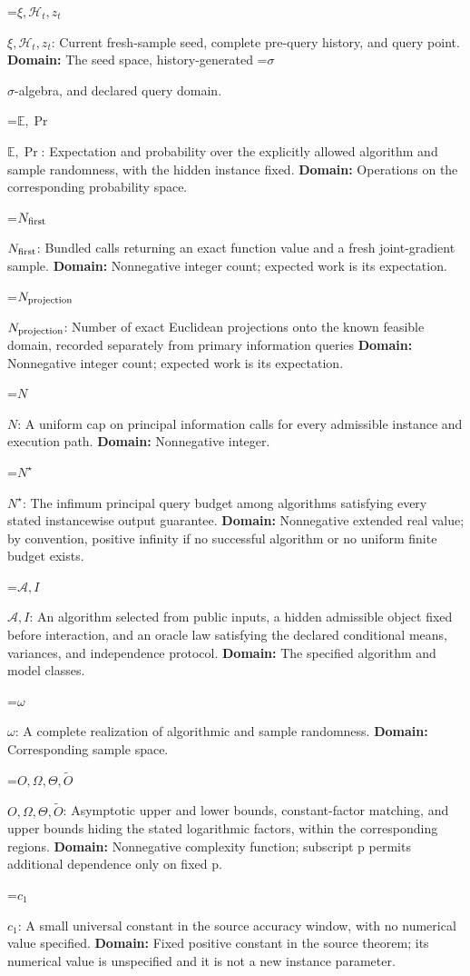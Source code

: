 \documentclass[10pt,a4paper]{article}
\newcommand{\AtlasMath}[1]{\par\begingroup\centering\setbox0=\hbox{$\displaystyle #1$}\ifdim\wd0>1.4\linewidth\typeout{ATLAS WIDE FORMULA: \the\wd0}\fi\ifdim\wd0>\linewidth\resizebox{\linewidth}{!}{\box0}\else\box0\fi\par\endgroup}
\newcommand{\AtlasInlineMath}[1]{\begingroup\setbox0=\hbox{$#1$}\ifdim\wd0>.4\linewidth\endgroup\AtlasMath{#1}\else\endgroup$#1$\fi}
\begin{document}
\AtlasInlineMath{\xi,\mathcal H_t,z_t}: Current fresh-sample seed, complete pre-query history, and query point. \textbf{Domain:} The seed space, history-generated \AtlasInlineMath{\sigma}-algebra, and declared query domain.

\AtlasInlineMath{\mathbb E,\Pr}: Expectation and probability over the explicitly allowed algorithm and sample randomness, with the hidden instance fixed. \textbf{Domain:} Operations on the corresponding probability space.

\AtlasInlineMath{N_{\rm first}}: Bundled calls returning an exact function value and a fresh joint-gradient sample. \textbf{Domain:} Nonnegative integer count; expected work is its expectation.

\AtlasInlineMath{N_{\rm projection}}: Number of exact Euclidean projections onto the known feasible domain, recorded separately from primary information queries \textbf{Domain:} Nonnegative integer count; expected work is its expectation.

\AtlasInlineMath{N}: A uniform cap on principal information calls for every admissible instance and execution path. \textbf{Domain:} Nonnegative integer.

\AtlasInlineMath{N^\star}: The infimum principal query budget among algorithms satisfying every stated instancewise output guarantee. \textbf{Domain:} Nonnegative extended real value; by convention, positive infinity if no successful algorithm or no uniform finite budget exists.

\AtlasInlineMath{\mathcal A,I}: An algorithm selected from public inputs, a hidden admissible object fixed before interaction, and an oracle law satisfying the declared conditional means, variances, and independence protocol. \textbf{Domain:} The specified algorithm and model classes.

\AtlasInlineMath{\omega}: A complete realization of algorithmic and sample randomness. \textbf{Domain:} Corresponding sample space.

\AtlasInlineMath{O,\Omega,\Theta,\widetilde O}: Asymptotic upper and lower bounds, constant-factor matching, and upper bounds hiding the stated logarithmic factors, within the corresponding regions. \textbf{Domain:} Nonnegative complexity function; subscript p permits additional dependence only on fixed p.

\AtlasInlineMath{c_1}: A small universal constant in the source accuracy window, with no numerical value specified. \textbf{Domain:} Fixed positive constant in the source theorem; its numerical value is unspecified and it is not a new instance parameter.
\end{document}
